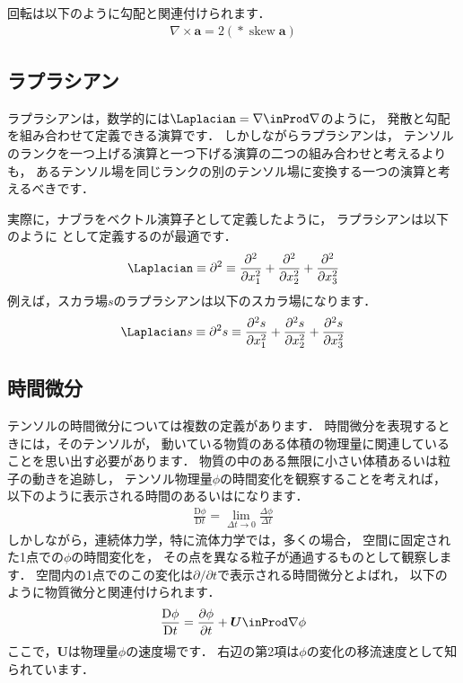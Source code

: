 回転は以下のように勾配と関連付けられます．
\begin{align}
 \label{eq:2.7}
 \nabla \times \bm{a} = 2(\mathop{*}\mathop{\mathrm{skew}}\bm{a})
\end{align}


\subsection{ラプラシアン}
\label{ssec:2.1.4}
ラプラシアンは，数学的には$\Laplacian = \nabla \inProd \nabla$のように，
発散と勾配を組み合わせて定義できる演算です．
しかしながらラプラシアンは，
テンソルのランクを一つ上げる演算と一つ下げる演算の二つの組み合わせと考えるよりも，
あるテンソル場を同じランクの別のテンソル場に変換する一つの演算と考えるべきです．

実際に，ナブラをベクトル演算子として定義したように，
ラプラシアンは以下のように
%
%
として定義するのが最適です．
\begin{align}
 \label{eq:2.8}
 \Laplacian \equiv \partial^{2} \equiv
 \frac{\partial^{2}}{\partial x_{1}^{2}}
 + \frac{\partial^{2}}{\partial x_{2}^{2}}
 + \frac{\partial^{2}}{\partial x_{3}^{2}}
\end{align}
例えば，スカラ場$s$のラプラシアンは以下のスカラ場になります．
\begin{align}
 \label{eq:2.9}
 \Laplacian s \equiv \partial^{2}s \equiv
 \frac{\partial^{2}s}{\partial x_{1}^{2}}
 + \frac{\partial^{2}s}{\partial x_{2}^{2}}
 + \frac{\partial^{2}s}{\partial x_{3}^{2}}
\end{align}


\subsection{時間微分}
\label{ssec:2.1.5}
テンソルの時間微分については複数の定義があります．
時間微分を表現するときには，そのテンソルが，
動いている物質のある体積の物理量に関連していることを思い出す必要があります．
物質の中のある無限に小さい体積あるいは粒子の動きを追跡し，
テンソル物理量$\phi$の時間変化を観察することを考えれば，
以下のように表示される時間のあるいはになります．
\begin{align}
 \label{eq:2.10}
 \frac{\mathrm{D}\phi}{\mathrm{D}t} = \lim_{\Delta t \to 0}\frac{\Delta\phi}{\Delta t}
\end{align}
しかしながら，連続体力学，特に流体力学では，多くの場合，
空間に固定された1点での$\phi$の時間変化を，
その点を異なる粒子が通過するものとして観察します．
空間内の1点でのこの変化は$\partial / \partial t$で表示される時間微分とよばれ，
以下のように物質微分と関連付けられます．
\begin{align}
 \label{eq:2.11}
 \frac{\mathrm{D}\phi}{\mathrm{D}t}
 = \frac{\partial\phi}{\partial t} + \bm{U} \inProd \nabla\phi
\end{align}
ここで，$\bm{U}$は物理量$\phi$の速度場です．
右辺の第2項は$\phi$の変化の移流速度として知られています．



